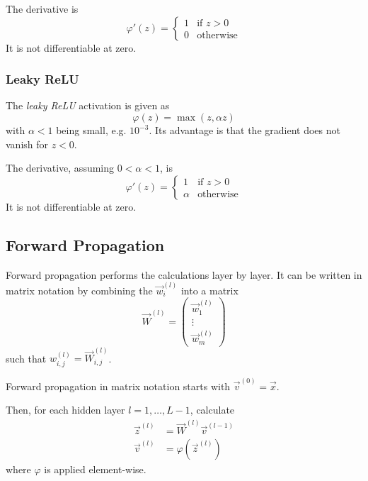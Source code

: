 The derivative is
\begin{equation*}
    \varphi'(z) =
    \begin{cases}
        1 & \text{if $z > 0$} \\
        0 & \text{otherwise}
    \end{cases}
\end{equation*}
It is not differentiable at zero.

\subsubsection{Leaky ReLU}
The \emph{leaky ReLU} activation is given as
\begin{equation*}
    \varphi(z) = \max(z, \alpha z)
\end{equation*}
with $\alpha < 1$ being small, e.g. $10^{-3}$.
Its advantage is that the gradient does not
vanish for $z < 0$.

The derivative, assuming $0 < \alpha < 1$, is
\begin{equation*}
    \varphi'(z) =
    \begin{cases}
        1 & \text{if $z > 0$} \\
        \alpha & \text{otherwise}
    \end{cases}
\end{equation*}
It is not differentiable at zero.


\subsection{Forward Propagation}
Forward propagation performs the calculations layer by layer.
It can be written in matrix notation by combining the
$\vec{w}_i^{(l)}$ into a matrix
\begin{equation*}
    \vec{W}^{(l)} =
    \begin{pmatrix}
    \vec{w}_1^{(l)} \\
    \vdots \\
    \vec{w}_m^{(l)}
    \end{pmatrix}
\end{equation*}
such that $w_{i,j}^{(l)} = \vec{W}_{i,j}^{(l)}$.

Forward propagation in matrix notation starts with
$\vec{v}^{(0)} = \vec{x}$.

Then, for each hidden layer $l = 1, \dotsc, L - 1$,
calculate
\begin{align*}
    \vec{z}^{(l)} &= \vec{W}^{(l)} \vec{v}^{(l-1)} \\
    \vec{v}^{(l)} &= \varphi(\vec{z}^{(l)})
\end{align*}
where $\varphi$ is applied element-wise.

